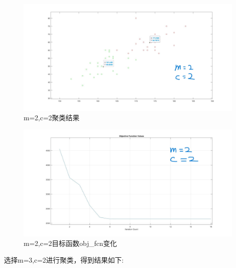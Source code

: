 \documentclass{article}
\begin{document}
\begin{figure}[H]
    \centering
    \includegraphics[width=1\textwidth]{image/Figure11_1.jpg}
    \caption{m=2,c=2聚类结果}
    \label{Figure11_1}
\end{figure}
\begin{figure}[H]
    \centering
    \includegraphics[width=1\textwidth]{image/Figure11_2.jpg}
    \caption{m=2,c=2目标函数obj\_fcn变化}
    \label{Figure11_2}
\end{figure}


选择m=3,c=2进行聚类，得到结果如下:
\end{document}
